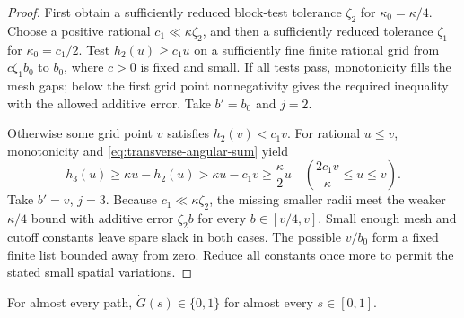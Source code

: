 \begin{proof}
First obtain a sufficiently reduced block-test tolerance $\zeta_2$
for $\kappa_0=\kappa/4$.  Choose a positive rational
$c_1\ll\kappa\zeta_2$, and then a sufficiently reduced tolerance
$\zeta_1$ for $\kappa_0=c_1/2$.
Test $h_2(u)\ge c_1u$ on a sufficiently fine finite rational grid
from $c\zeta_1b_0$ to $b_0$, where $c>0$ is fixed and small.
If all tests pass, monotonicity fills the mesh gaps; below the
first grid point nonnegativity gives the required inequality with
the allowed additive error.  Take $b'=b_0$ and $j=2$.

Otherwise some grid point $v$ satisfies $h_2(v)<c_1v$.
For rational $u\le v$, monotonicity and
\eqref{eq:transverse-angular-sum} yield
\[
 h_3(u)\ge\kappa u-h_2(u)>\kappa u-c_1v
            \ge\frac\kappa2u
       \quad\left(\frac{2c_1v}{\kappa}\le u\le v\right).
\]
Take $b'=v$, $j=3$.  Because $c_1\ll\kappa\zeta_2$, the missing
smaller radii meet the weaker $\kappa/4$ bound with additive error
$\zeta_2b$ for every $b\in[v/4,v]$.  Small enough mesh and cutoff
constants leave spare slack in both cases.  The possible $v/b_0$
form a fixed finite list bounded away from zero.  Reduce all
constants once more to permit the stated small spatial variations.
\end{proof}

\begin{lemma}\label{lem:transverse-binary}
For almost every path, $\dot G(s)\in\{0,1\}$ for almost every
$s\in[0,1]$.
\end{lemma}

